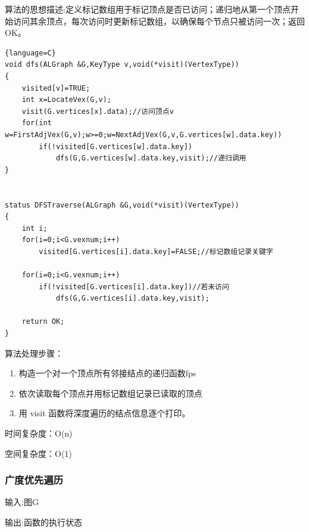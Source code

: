 \documentclass[supercite]{Experimental_Report}
\theoremstyle{definition}
\begin{document}
算法的思想描述:定义标记数组用于标记顶点是否已访问；递归地从第一个顶点开始访问其余顶点，每次访问时更新标记数组，以确保每个节点只被访问一次；返回 OK。
\begin{lstlisting}{language=C}
void dfs(ALGraph &G,KeyType v,void(*visit)(VertexType))
{
	visited[v]=TRUE;
	int x=LocateVex(G,v);
	visit(G.vertices[x].data);//访问顶点v
	for(int w=FirstAdjVex(G,v);w>=0;w=NextAdjVex(G,v,G.vertices[w].data.key)) 
		if(!visited[G.vertices[w].data.key])
            dfs(G,G.vertices[w].data.key,visit);//递归调用
}


status DFSTraverse(ALGraph &G,void(*visit)(VertexType))
{
	int i;
	for(i=0;i<G.vexnum;i++)
	    visited[G.vertices[i].data.key]=FALSE;//标记数组记录关键字 

	for(i=0;i<G.vexnum;i++)
		if(!visited[G.vertices[i].data.key])//若未访问
			dfs(G,G.vertices[i].data.key,visit);
	
	return OK;
} 
\end{lstlisting}
算法处理步骤：
\begin{enumerate}
	\renewcommand{\labelenumi}{\theenumi)}
	\item  构造一个对一个顶点所有邻接结点的递归函数fps
	\item  依次读取每个顶点并用标记数组记录已读取的顶点
	\item  用 visit 函数将深度遍历的结点信息逐个打印。
\end{enumerate}

时间复杂度：O(n)

空间复杂度：O(1)

\subsubsection{广度优先遍历}
输入:图G

输出:函数的执行状态
\end{document}
